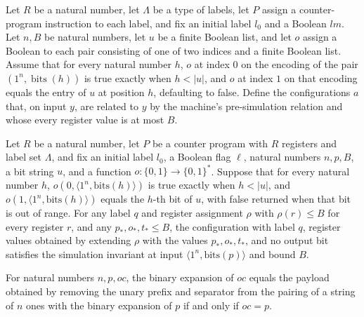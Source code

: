 \begin{definition}
\label{Complexity.CPSim.G}
\leanok
{}
Let $R$ be a natural number, let $\Lambda$ be a type of labels, let $P$ assign a
counter-program instruction to each label, and fix an initial label $l_0$ and a Boolean
$lm$. Let $n,B$ be natural numbers, let $u$ be a finite Boolean list, and let $o$ assign
a Boolean to each pair consisting of one of two indices and a finite Boolean list.
Assume that for every natural number $h$, $o$ at index $0$ on the encoding of the pair
$(1^n,\operatorname{bits}(h))$ is true exactly when $h<|u|$, and $o$ at index $1$ on
that encoding equals the entry of $u$ at position $h$, defaulting to false. Define the
configurations $a$ that, on input $y$, are related to $y$ by the machine's
pre-simulation relation and whose every register value is at most $B$.
\end{definition}

\begin{lemma}
\label{Complexity.CPSim.G_ev}
\leanok
{}
Let $R$ be a natural number, let $P$ be a counter program with $R$ registers and label
set $\Lambda$, and fix an initial label $l_0$, a Boolean flag $\ell$, natural numbers
$n,p,B$, a bit string $u$, and a function $o:\{0,1\}\to\{0,1\}^*$. Suppose that for
every natural number $h$, $o(0,\langle 1^n,\mathrm{bits}(h)\rangle)$ is true exactly
when $h<|u|$, and $o(1,\langle 1^n,\mathrm{bits}(h)\rangle)$ equals the $h$-th bit of
$u$, with false returned when that bit is out of range. For any label $q$ and register
assignment $\rho$ with $\rho(r)\le B$ for every register $r$, and any $p_*,o_*,t_*\le
B$, the configuration with label $q$, register values obtained by extending $\rho$ with
the values $p_*,o_*,t_*$, and no output bit satisfies the simulation invariant at input
$\langle 1^n,\mathrm{bits}(p)\rangle$ and bound $B$.
\end{lemma}

\begin{lemma}
\label{Complexity.CPSim.jeqIn_eq}
\leanok
{}
For natural numbers $n,p,oc$, the binary expansion of $oc$ equals the payload obtained
by removing the unary prefix and separator from the pairing of a string of $n$ ones with
the binary expansion of $p$ if and only if $oc=p$.
\end{lemma}

